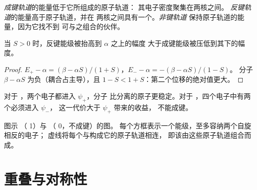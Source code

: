 \begin{definition}[成键轨道与反键轨道]\label{def:b2:diatomic-mos:bonding}
\emph{成键轨道}的能量低于它所组成的原子轨道：
其电子密度聚集在两核之间。
\emph{反键轨道}的能量高于原子轨道，并在
两核之间具有一个。\emph{非键轨道}
保持原子轨道的能量，因为它找不到
可与之组合的伙伴。
\end{definition}

\begin{proposition}[反键轨道升高得更多]\label{prop:b2:diatomic-mos:asymmetry}
当 $S > 0$ 时，反键能级被抬高到 $\alpha$ 之上的幅度
大于成键能级被压低到其下的幅度。
\end{proposition}

\begin{proof}
$E_+ - \alpha = (\beta - \alpha S)/(1 + S)$，$E_- - \alpha = -(\beta - \alpha S)/(1 - S)$。
分子 $\beta - \alpha S$ 为负（耦合占主导），且 $1 - S < 1
+ S$：第二个位移的绝对值更大。
\end{proof}

对于 ，两个电子都进入 $\psi_+$，分子
比分离的原子更稳定。对于 ，四个电子中有两个必须进入 $\psi_-$，
这一代价大于 $\psi_+$ 带来的收益， 不能成键。

\begin{omfigure}
\begin{MOdiagram}
\end{MOdiagram}
\hspace{1.5cm}
\begin{MOdiagram}
\end{MOdiagram}

{\small 图示 （ 1）与 （ 0，不成键）的图。
每个方框表示一个能级，至多容纳两个自旋相反的电子；
虚线将每个与构成它的原子轨道相连，
即该由这些原子轨道组合而成。}
\end{omfigure}

\section{重叠与对称性}

